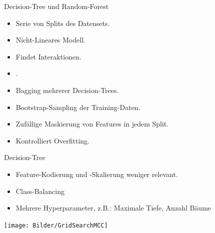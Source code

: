 \begin{frame}{Decision-Tree und Random-Forest}
{
\begin{itemize}
\item Serie von Splits des Datensets.
\item Nicht-Lineares Modell.
\item Findet Interaktionen.
\item {}.
\end{itemize}
}
{
\begin{itemize}
\item Bagging mehrerer Decision-Trees.
\item Bootstrap-Sampling der Training-Daten.
\item Zufällige Maskierung von Features in jedem Split.
\item Kontrolliert Overfitting.
\end{itemize}
}
\end{frame}

\begin{frame}{Decision-Tree}
{
\begin{itemize}
\item Feature-Kodierung und -Skalierung weniger relevant.
\item Class-Balancing
\item Mehrere Hyperparameter, z.B.: Maximale Tiefe, Anzahl Bäume
\end{itemize}
}
\centering
\texttt{[image: Bilder/GridSearchMCC]} 
\end{frame}

